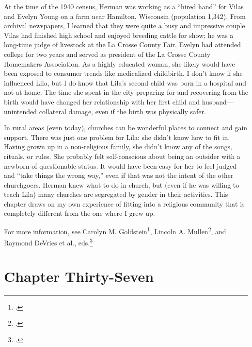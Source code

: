 \documentclass[
  letterpaper,
]{book}
\begin{document}
At the time of the 1940 census, Herman was working as a ``hired hand''
for Vilas and Evelyn Young on a farm near Hamilton, Wisconsin
(population 1,342). From archival newspapers, I learned that they were
quite a busy and impressive couple. Vilas had finished high school and
enjoyed breeding cattle for show; he was a long-time judge of livestock
at the La Crosse County Fair. Evelyn had attended college for two years
and served as president of the La Crosse County Homemakers Association.
As a highly educated woman, she likely would have been exposed to
consumer trends like medicalized childbirth. I don't know if she
influenced Lila, but I do know that Lila's second child was born in a
hospital and not at home. The time she spent in the city preparing for
and recovering from the birth would have changed her relationship with
her first child and husband---unintended collateral damage, even if the
birth was physically safer.

In rural areas (even today), churches can be wonderful places to connect
and gain support. There was just one problem for Lila: she didn't know
how to fit in. Having grown up in a non-religious family, she didn't
know any of the songs, rituals, or rules. She probably felt
self-conscious about being an outsider with a newborn of questionable
status. It would have been easy for her to feel judged and ``take things
the wrong way,'' even if that was not the intent of the other
churchgoers. Herman knew what to do in church, but (even if he was
willing to teach Lila) many churches are segregated by gender in their
activities. This chapter draws on my own experience of fitting into a
religious community that is completely different from the one where I
grew up.

For more information, see Carolyn M. Goldstein\footnote{.}, Lincoln A.
Mullen\footnote{.}, and Raymond DeVries et al.,
eds.\footnote{.}


\chapter{Chapter Thirty-Seven}\label{chapter-thirty-seven}
\end{document}
